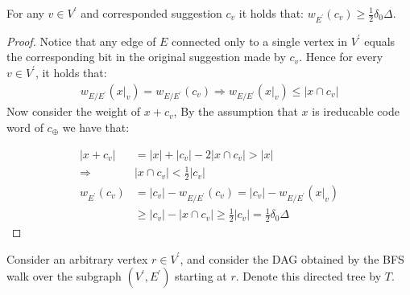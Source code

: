 \documentclass[manuscript,screen,review]{acmart}
\begin{document}
\begin{claim}\label{claim:deg} For any $v \in V^\prime$ and corresponded suggestion $c_{v}$ it holds that: $w_{E^\prime}\left( c_{v} \right) \ge \frac{1}{2}\delta_{0}\Delta$. \end{claim}
  \begin{proof} Notice that any edge of $E$ connected only to a single vertex in $V^\prime$ equals the corresponding bit in the original suggestion made by $c_{v}$. Hence for every $v\in V^\prime$, it holds that: 
\begin{equation*}
      \begin{split}
	    w_{E / E^\prime}\left(x|_{v}\right) = w_{E / E^\prime}\left(c_{v}\right) \Rightarrow  w_{E / E^\prime}\left(x|_{v}\right) \le | x \cap c_{v} |
      \end{split}
    \end{equation*}
     Now consider the weight of $x + c_{v}$, By the assumption that $x$ is ireducable code word of $c_{\oplus}$ we have that: 
  
 \begin{equation*}
    \begin{split}
       |x + c_{v}| & = |x| + |c_{v}| - 2|x \cap c_{v}| > |x| \\
       \Rightarrow &   |x \cap c_{v}|  < \frac{1}{2} |c_{v}| \\
      w_{E^\prime}\left( c_{v} \right) &= |c_{v}| - w_{E / E^\prime}\left( c_{v} \right) =  |c_{v} | - w_{E / E^\prime}\left( x|_{v} \right) \\ 
      & \ge | c_{v} | - | x \cap c_{v} |  \ge \frac{1}{2}|c_{v}| = \frac{1}{2}\delta_{0}\Delta 
    \end{split}
  \end{equation*}
  \end{proof}

  Consider an arbitrary vertex $r \in V^\prime$, and consider the DAG obtained by the BFS walk over the subgraph $\left(V^\prime, E^\prime \right)$ starting at $r$. Denote this directed tree by $T$.

\end{document}
